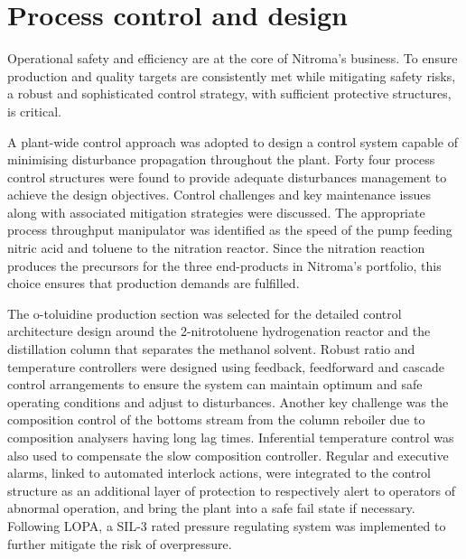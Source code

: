 \section*{Process control and design}

Operational safety and efficiency are at the core of Nitroma's business. To ensure production and quality targets are consistently met while mitigating safety risks, a robust and sophisticated control strategy, with sufficient protective structures, is critical.

A plant-wide control approach was adopted to design a control system capable of minimising disturbance propagation throughout the plant. Forty four process control structures were found to provide adequate disturbances management to achieve the design objectives. Control challenges and key maintenance issues along with associated mitigation strategies were discussed. The appropriate process throughput manipulator was identified as the speed of the pump feeding nitric acid and toluene to the nitration reactor. Since the nitration reaction produces the precursors for the three end-products in Nitroma's portfolio, this choice ensures that production demands are fulfilled.    

The o-toluidine production section was selected for the detailed control architecture design around the 2-nitrotoluene hydrogenation reactor and the distillation column that separates the methanol solvent. Robust ratio and temperature controllers were designed using feedback, feedforward and cascade control arrangements to ensure the system can maintain optimum and safe operating conditions and adjust to disturbances. Another key challenge was the composition control of the bottoms stream from the column reboiler due to composition analysers having long lag times. Inferential temperature control was also used to compensate the slow composition controller. 
Regular and executive alarms, linked to automated interlock actions, were integrated to the control structure as an additional layer of protection to respectively alert to operators of abnormal operation, and bring the plant into a safe fail state if necessary. Following LOPA, a SIL-3 rated pressure regulating system was implemented to further mitigate the risk of overpressure.




